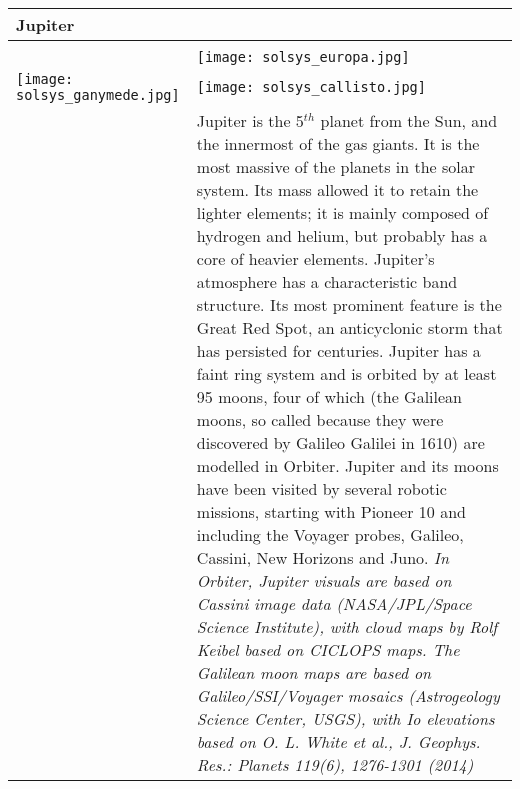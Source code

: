\documentclass[Orbiter User Manual.tex]{subfiles}
\begin{document}
\begin{table}[H]
	\begin{tabularx}{\textwidth}{ |lX| }
	\hline\rule{0pt}{2ex}
	\textbf{Jupiter} &\\
	\hline\rule{0pt}{2ex}
	\adjustbox{valign=t}{
		\begin{tabular}{ c }
		\texttt{[image: solsys\_jupiter.jpg]}\\
			\adjustbox{valign=t}{
			\begin{tabular}{ ll }
			\texttt{[image: solsys\_io.jpg]} &
			\texttt{[image: solsys\_europa.jpg]}\\
			\texttt{[image: solsys\_ganymede.jpg]} &
			\texttt{[image: solsys\_callisto.jpg]}\\
			\end{tabular}
			}
		\end{tabular}
		}
	& \vfill
	Jupiter is the 5$^{th}$ planet from the Sun, and the innermost of the gas giants. It is the most massive of the planets in the solar system. Its mass allowed it to retain the lighter elements; it is mainly composed of hydrogen and helium, but probably has a core of heavier elements. Jupiter's atmosphere has a characteristic band structure. Its most prominent feature is the Great Red Spot, an anticyclonic storm that has persisted for centuries.\newline
	Jupiter has a faint ring system and is orbited by at least 95 moons, four of which (the Galilean moons, so called because they were discovered by Galileo Galilei in 1610) are modelled in Orbiter.\newline
	Jupiter and its moons have been visited by several robotic missions, starting with Pioneer 10 and including the Voyager probes, Galileo, Cassini, New Horizons and Juno.\newline
	\newline
	\textit{In Orbiter, Jupiter visuals are based on Cassini image data (NASA/JPL/Space Science Institute), with cloud maps by Rolf Keibel based on CICLOPS maps.\newline
	The Galilean moon maps are based on Galileo/SSI/Voyager mosaics (Astrogeology Science Center, USGS), with Io elevations based on O. L. White et al., J. Geophys. Res.: Planets 119(6), 1276-1301 (2014)}\\
	\hline
	\end{tabularx}
\end{table}
\end{document}
